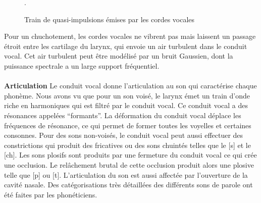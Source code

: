 \begin{figure}
\vspace{2cm}
\caption{Train de quasi-impulsions \'emises par les cordes
vocales}.
\label{quasi-impulsions}
\end{figure}

Pour un chuchotement, les cordes vocales ne vibrent pas
mais laissent un passage
\'etroit entre les cartilage du larynx, qui envoie un
air turbulent dans le conduit vocal.
Cet air turbulent peut \^etre mod\'elis\'e par un bruit Gaussien, dont
la puissance spectrale a un large support fr\'equentiel.
\\
\\
{\bf Articulation}
Le conduit vocal donne l'articulation au son qui caract\'erise chaque
phon\`eme. Nous avons vu que
pour un son vois\'e, le larynx \'emet un train d'onde
riche en harmoniques qui est filtr\'e par le conduit
vocal. Ce conduit vocal a des r\'esonances appel\'ees ``formants''.
La d\'eformation du conduit vocal d\'eplace les fr\'equences de
r\'esonance, ce qui permet de former
toutes les voyelles et certaines consonnes.
Pour des sons non-vois\'es, le conduit vocal peut aussi effectuer
des constrictions qui produit des fricatives ou des sons
chuint\'es telles que le
[s] et le [ch].
Les sons plosifs sont produits par une fermeture du conduit
vocal ce qui cr\'ee une occlusion. Le rel\^achement brutal de
cette occlusion produit alors une plosive telle que [p] ou [t].
L'articulation du son est aussi affect\'ee par
l'ouverture de la cavit\'e nasale.
Des cat\'egorisations tr\`es d\'etaill\'ees des
diff\'erents sons de parole ont \'et\'e faites
par les phon\'eticiens.


